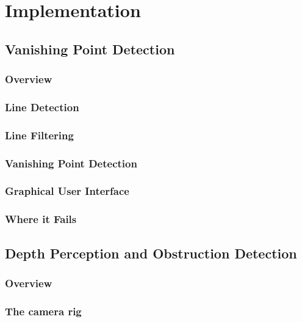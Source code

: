 \chapter{Implementation}
\label{chp:implementation}

\section{Vanishing Point Detection}

\subsection{Overview}

\subsection{Line Detection}

\subsection{Line Filtering}

\subsection{Vanishing Point Detection}

\subsection{Graphical User Interface}

\subsection{Where it Fails}

\section{Depth Perception and Obstruction Detection}

\subsection{Overview}

\subsection{The camera rig}

